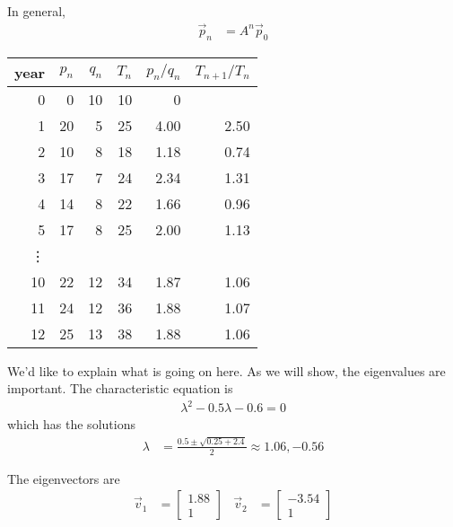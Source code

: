  
 In general,
\begin{align*}
 \vec{p}_n & = A^n \vec{p}_0
\end{align*}


\begin{center}
 
\begin{tabular}{rrrrrr}
year & $p_n$ & $q_n$ & $T_n$ & $p_n/q_n$ & $T_{n+1}/T_n$ \\ \hline
0 & 0 & 10 & 10 & 0 & \\
1 & 20 & 5 & 25 & 4.00 & 2.50 \\
2 & 10 & 8 & 18 & 1.18 & 0.74 \\
3 & 17 & 7 & 24 & 2.34 & 1.31 \\
4 & 14 & 8 & 22 & 1.66 & 0.96 \\
5 & 17 & 8 & 25 & 2.00 & 1.13 \\
\vdots \\
10 & 22 & 12 & 34 & 1.87 & 1.06 \\
11 & 24 & 12 & 36 & 1.88 & 1.07 \\
12 & 25 & 13 & 38 & 1.88 & 1.06 
\end{tabular}
\end{center}

We'd like to explain what is going on here.  As we will show, the eigenvalues are important.  The characteristic equation is
% 
\begin{align*}
 \lambda^2 -0.5 \lambda -0.6 = 0 
\end{align*}
which has the solutions
% 
\begin{align*}
 \lambda & = \frac{0.5 \pm \sqrt{0.25 + 2.4}}{2} \approx 1.06, -0.56 
\end{align*}

The eigenvectors are
% 
\begin{align*}
 \vec{v}_1 & = 
\begin{bmatrix}
 1.88 \\ 1 
\end{bmatrix} & \vec{v}_2 & = 
\begin{bmatrix}
 -3.54 \\1 
\end{bmatrix}
\end{align*}



